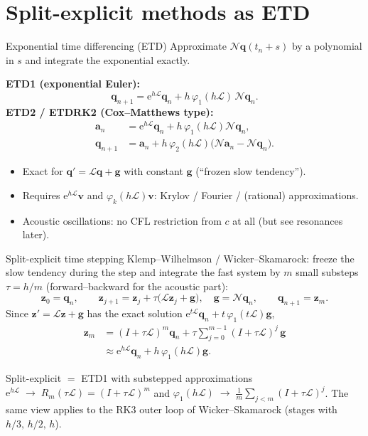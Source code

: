 \documentclass[aspectratio=169,10pt]{beamer}
\newcommand{\ee}{\mathrm{e}}
\newcommand{\bq}{\mathbf{q}}
\newcommand{\LL}{\mathcal{L}}   %
\newcommand{\NN}{\mathcal{N}}   %
\newcommand{\ph}{\varphi}
\begin{document}
	\section{Split-explicit methods as ETD}
	
	\begin{frame}{Exponential time differencing (ETD)}
		Approximate $\NN\bq(t_n+s)$ by a polynomial in $s$ and integrate the exponential exactly.
		
		\medskip
		\textbf{ETD1 (exponential Euler):}
		\[
		\bq_{n+1}=\ee^{h\LL}\bq_n+h\,\ph_1(h\LL)\,\NN\bq_n .
		\]
		\textbf{ETD2 / ETDRK2 (Cox--Matthews type):}
		\begin{align*}
			\mathbf{a}_n &= \ee^{h\LL}\bq_n+h\,\ph_1(h\LL)\NN\bq_n,\\
			\bq_{n+1} &= \mathbf{a}_n + h\,\ph_2(h\LL)\big(\NN\mathbf{a}_n-\NN\bq_n\big).
		\end{align*}
		\begin{itemize}
			\item Exact for $\bq'=\LL\bq+\mathbf{g}$ with constant $\mathbf{g}$ (``frozen slow tendency'').
			\item Requires $\ee^{h\LL}\mathbf{v}$ and $\ph_k(h\LL)\mathbf{v}$: Krylov / Fourier / (rational) approximations.
			\item Acoustic oscillations: no CFL restriction from $c$ at all (but see resonances later).
		\end{itemize}
	\end{frame}
	
	\begin{frame}{Split-explicit time stepping}
		Klemp--Wilhelmson / Wicker--Skamarock: freeze the slow tendency during the step and integrate the fast
		system by $m$ small substeps $\tau=h/m$ (forward--backward for the acoustic part):
		\[
		\mathbf{z}_0=\bq_n,\qquad
		\mathbf{z}_{j+1}=\mathbf{z}_j+\tau\big(\LL\mathbf{z}_j+\mathbf{g}\big),\quad \mathbf{g}=\NN\bq_n,
		\qquad \bq_{n+1}=\mathbf{z}_m .
		\]
		Since $\mathbf{z}'=\LL\mathbf{z}+\mathbf{g}$ has the exact solution $\ee^{t\LL}\bq_n+t\,\ph_1(t\LL)\mathbf{g}$,
		\begin{align*}
			\mathbf{z}_m &= (I+\tau\LL)^m\bq_n+\tau\sum_{j=0}^{m-1}(I+\tau\LL)^j\,\mathbf{g}\\
			&\approx \ee^{h\LL}\bq_n + h\,\ph_1(h\LL)\mathbf{g}.
		\end{align*}
		\begin{block}{Split-explicit $=$ ETD1 with substepped approximations}
			$\ee^{h\LL}\;\to\;R_m(\tau\LL)=(I+\tau\LL)^m$ and $\ph_1(h\LL)\;\to\;\frac1m\sum_{j<m}(I+\tau\LL)^j$.
			The same view applies to the RK3 outer loop of Wicker--Skamarock (stages with $h/3,\,h/2,\,h$).
		\end{block}
	\end{frame}
	
\end{document}
